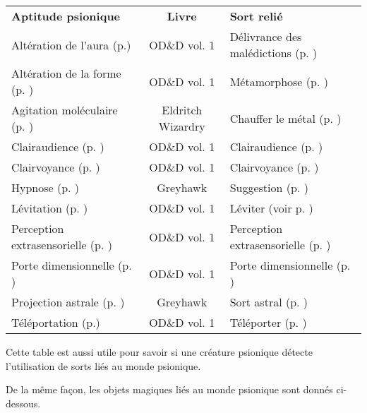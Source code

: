 \begin{tabular}{lcl}
\textbf{Aptitude psionique}                                     & \textbf{Livre}    & \textbf{Sort relié} \\
Altération de l'aura (p.\pageref{clerc-alteration-aura})        & OD\&D vol. 1       & Délivrance des malédictions (p. \pageref{sort-delivrance-malediction}) \\
Altération de la forme (p. \pageref{magicien-alteration-forme}) & OD\&D vol. 1       & Métamorphose (p. \pageref{sort-metamorphose}) \\
Agitation moléculaire (p. \pageref{magicien-agitation-mol})     & Eldritch Wizardry & Chauffer le métal (p. \pageref{sort-chauffe-metal}) \\
Clairaudience (p. \pageref{guerrier-clairaudience})             & OD\&D vol. 1       & Clairaudience (p. \pageref{sort-clairaudience}) \\
Clairvoyance (p. \pageref{guerrier-clairvoyance})               & OD\&D vol. 1       & Clairvoyance (p. \pageref{sort-clairvoyance}) \\
Hypnose (p. \pageref{magicien-hypnose})                         & Greyhawk          & Suggestion (p. \pageref{sort-suggestion}) \\
Lévitation (p. \pageref{guerrier-levitation})                   & OD\&D vol. 1       & Léviter (voir p. \pageref{sort-levitation}) \\
Perception extrasensorielle (p. \pageref{magicien-ESP})         & OD\&D vol. 1       & Perception extrasensorielle (p. \pageref{sort-esp}) \\
Porte dimensionnelle (p. \pageref{magicien-porte-dimensionnelle}) & OD\&D vol. 1     & Porte dimensionnelle (p. \pageref{sort-porte-dimensionnelle}) \\
Projection astrale (p. \pageref{guerrier-projection-astrale})   & Greyhawk          & Sort astral (p. \pageref{sort-astral}) \\
Téléportation (p.\pageref{magicien-teleportation})              & OD\&D vol. 1       & Téléporter (p. \pageref{sort-teleporter}) \\
\end{tabular}

\bigskip

Cette table est aussi utile pour savoir si une créature psionique détecte l'utilisation de sorts liés au monde psionique.

\bigskip

De la même façon, les objets magiques liés au monde psionique sont donnés ci-dessous.

